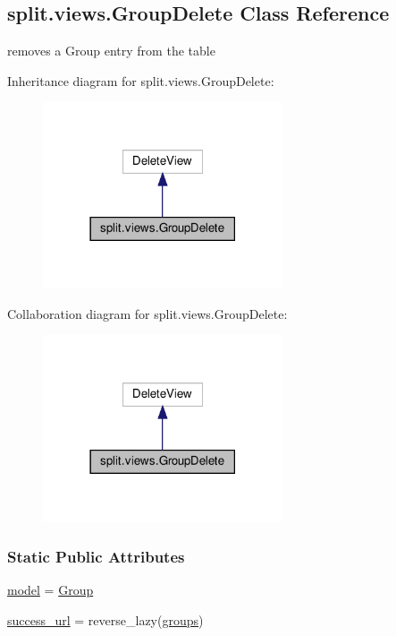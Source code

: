 \hypertarget{classsplit_1_1views_1_1GroupDelete}{}\subsection{split.\+views.\+Group\+Delete Class Reference}
\label{classsplit_1_1views_1_1GroupDelete}


removes a Group entry from the table  




Inheritance diagram for split.\+views.\+Group\+Delete\+:\nopagebreak
\begin{figure}[H]
\begin{center}
\leavevmode
\includegraphics[width=201pt]{classsplit_1_1views_1_1GroupDelete__inherit__graph}
\end{center}
\end{figure}


Collaboration diagram for split.\+views.\+Group\+Delete\+:\nopagebreak
\begin{figure}[H]
\begin{center}
\leavevmode
\includegraphics[width=201pt]{classsplit_1_1views_1_1GroupDelete__coll__graph}
\end{center}
\end{figure}
\subsubsection*{Static Public Attributes}
\begin{DoxyCompactItemize}
\item 
\hyperlink{classsplit_1_1views_1_1GroupDelete_a0d1fed74b229e13e410383a61afcd94f}{model} = \hyperlink{classsplit_1_1models_1_1Group}{Group}
\item 
\hyperlink{classsplit_1_1views_1_1GroupDelete_a68e5d1602d12c5db02a6a20c2f6da3ae}{success\+\_\+url} = reverse\+\_\+lazy(\textquotesingle{}\hyperlink{namespacesplit_1_1views_a419d7fc72bf890d32aba4fc21c7568d6}{groups}\textquotesingle{})
\end{DoxyCompactItemize}


